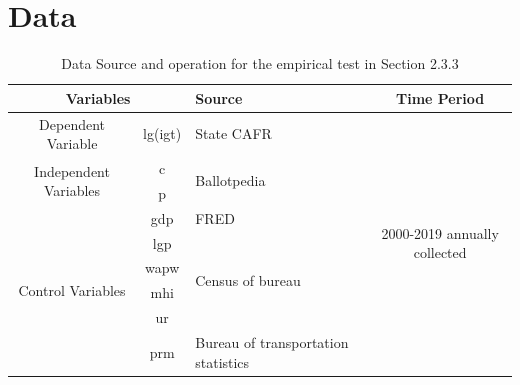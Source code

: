
\section{Data}
\begin{table}[htbp]
  \centering
  \caption{Data Source and operation for the empirical test in Section 2.3.3}
  \begin{tabular}{ccp{8.785em}c}
    \toprule
    \multicolumn{2}{p{13.93em}}{Variables }                                         & Source  & \multicolumn{1}{p{7.785em}}{Time Period}                                                                         \\
    \midrule
    \multicolumn{1}{p{7em}}{Dependent Variable}                                     & lg(igt) & State CAFR                               & \multicolumn{1}{c}{\multirow{9}[18]{*}{2000-2019 annually collected}} \\
    \cmidrule{1-3}    \multicolumn{1}{c}{\multirow{2}[4]{*}{Independent Variables}} & c       & \multirow{2}[4]{*}{Ballotpedia}          &                                                                       \\
    \cmidrule{2-2}                                                                  & p       & \multicolumn{1}{c}{}                     &                                                                       \\
    \cmidrule{1-3}    \multicolumn{1}{c}{\multirow{6}[12]{*}{Control Variables}}    & gdp     & FRED                                     &                                                                       \\
    \cmidrule{2-3}                                                                  & lgp     & \multirow{4}[8]{*}{Census of bureau}     &                                                                       \\
    \cmidrule{2-2}                                                                  & wapw    & \multicolumn{1}{c}{}                     &                                                                       \\
    \cmidrule{2-2}                                                                  & mhi     & \multicolumn{1}{c}{}                     &                                                                       \\
    \cmidrule{2-2}                                                                  & ur      & \multicolumn{1}{c}{}                     &                                                                       \\
    \cmidrule{2-3}                                                                  & prm     & Bureau of transportation statistics      &                                                                       \\
    \bottomrule
  \end{tabular}%
  \label{Table A.1}%
\end{table}%


